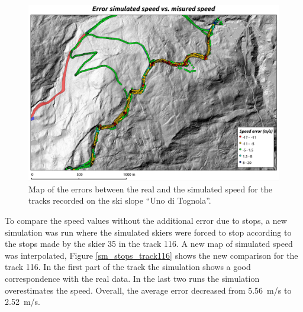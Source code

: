 \documentclass[12pt,a4paper,twoside]{book}
\begin{document}
\begin{figure}[!h]
  \centering
    \includegraphics[width=\textwidth]{images/map_error.eps}
    \caption{Map of the errors between the real and the simulated speed for the tracks recorded on the ski slope ``Uno di Tognola''.}\label{map_error}
\end{figure}

To compare the speed values without the additional error due to stops, a new simulation was run where the simulated skiers were forced to stop according to the stops made by the skier 35 in the track 116. A new map of simulated speed was interpolated, Figure \ref{sm_stops_track116} shows the new comparison for the track 116. In the first part of the track the simulation shows a good correspondence with the real data. In the last two runs the simulation overestimates the speed. Overall, the average error decreased from 5.56~m/s to 2.52~m/s.
\end{document}
